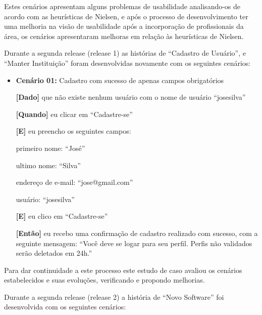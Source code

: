 Estes cenários apresentam alguns problemas de usabilidade analisando-os de acordo com as heurísticas de Nielsen, e após o processo de desenvolvimento ter uma melhoria na visão de usabilidade após a incorporação de profissionais da área, os cenários apresentaram melhoras em relação às heurísticas de Nielsen. 

Durante a segunda release (release 1) as histórias de ``Cadastro de Usuário'', e ``Manter Instituição'' foram desenvolvidas novamente com os seguintes cenários:

\begin{itemize}
\item\textbf{Cenário 01:} Cadastro com sucesso de apenas campos obrigatórios

	\textbf{[Dado]} que não existe nenhum usuário com o nome de usuário ``josesilva''

	\textbf{[Quando]} eu clicar em ``Cadastre-se''

	\textbf{[E]} eu preencho os seguintes campos: 

  		\subitem primeiro nome: ``José''

  		\subitem ultimo nome: ``Silva''

  		\subitem endereço de e-mail: ``jose@gmail.com''

  		\subitem usuário: ``josesilva''
  		
	\textbf{[E]} eu clico em ``Cadastre-se''

	\textbf{[Então]} eu recebo uma confirmação de cadastro realizado com sucesso, com a seguinte mensagem: 
	``Você deve se logar para seu perfil. Perfis não validados serão deletados em 24h.''
\end{itemize}

Para dar continuidade a este processo este estudo de caso avaliou os cenários estabelecidos e suas evoluções, verificando e propondo melhorias.

Durante a segunda release (release 2) a história de ``Novo Software'' foi desenvolvida com os seguintes cenários:

